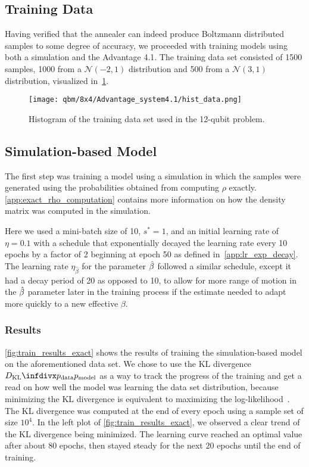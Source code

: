 \subsection{Training Data}
Having verified that the annealer can indeed produce Boltzmann distributed samples to some degree of accuracy, we proceeded with training models using both a simulation and the Advantage 4.1.
The training data set consisted of 1500 samples, 1000 from a \( \mathcal{N}(-2, 1) \) distribution and 500 from a \( \mathcal{N}(3, 1) \) distribution, visualized in~\cref{fig:hist_data}.
\begin{figure}[!htb]
    \begin{center}
        \texttt{[image: qbm/8x4/Advantage\_system4.1/hist\_data.png]}
    \end{center}
    \caption{
        Histogram of the training data set used in the 12-qubit problem.
    }
    \label{fig:hist_data}
\end{figure}

\subsection{Simulation-based Model}
The first step was training a model using a simulation in which the samples were generated using the probabilities obtained from computing \( \rho \) exactly.
\cref{app:exact_rho_computation} contains more information on how the density matrix was computed in the simulation.

Here we used a mini-batch size of 10, \( s^* = 1 \), and an initial learning rate of \( \eta = 0.1 \) with a schedule that exponentially decayed the learning rate every 10 epochs by a factor of 2 beginning at epoch 50 as defined in~\cref{app:lr_exp_decay}.
The learning rate \( \eta_{\hat{\beta}} \) for the parameter \( \hat{\beta} \) followed a similar schedule, except it had a decay period of 20 as opposed to 10, to allow for more range of motion in the \( \hat{\beta} \) parameter later in the training process if the estimate needed to adapt more quickly to a new effective \( \beta \).

\subsubsection{Results}\label{sec:qbm_simulation_results}
\cref{fig:train_results_exact} shows the results of training the simulation-based model on the aforementioned data set.
We chose to use the KL divergence \( \DKL{\pdata}{\pmodel} \) as a way to track the progress of the training and get a read on how well the model was learning the data set distribution, because minimizing the KL divergence is equivalent to maximizing the log-likelihood~\cite{murphy_2012}.
The KL divergence was computed at the end of every epoch using a sample set of size \( 10^4 \).
In the left plot of \cref{fig:train_results_exact}, we observed a clear trend of the KL divergence being minimized.
The learning curve reached an optimal value after about 80 epochs, then stayed steady for the next 20 epochs until the end of training.

